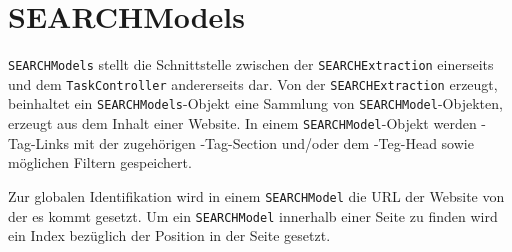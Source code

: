 
\section{SEARCHModels}
\lstinline|SEARCHModels| stellt die Schnittstelle zwischen der \lstinline|SEARCHExtraction| einerseits und dem \lstinline|TaskController| andererseits dar. Von der \lstinline|SEARCHExtraction| erzeugt, beinhaltet ein \lstinline|SEARCHModels|-Objekt eine Sammlung von \lstinline|SEARCHModel|-Objekten, erzeugt aus dem Inhalt einer Website. In einem \lstinline|SEARCHModel|-Objekt werden \SEARCH-Tag-Links mit der zugehörigen \SEARCH-Tag-Section und/oder dem \SEARCH-Teg-Head sowie möglichen Filtern gespeichert.

Zur globalen Identifikation wird in einem \lstinline|SEARCHModel| die URL der Website von der es kommt gesetzt. Um ein \lstinline|SEARCHModel| innerhalb einer Seite zu finden wird ein Index bezüglich der Position in der Seite gesetzt.
